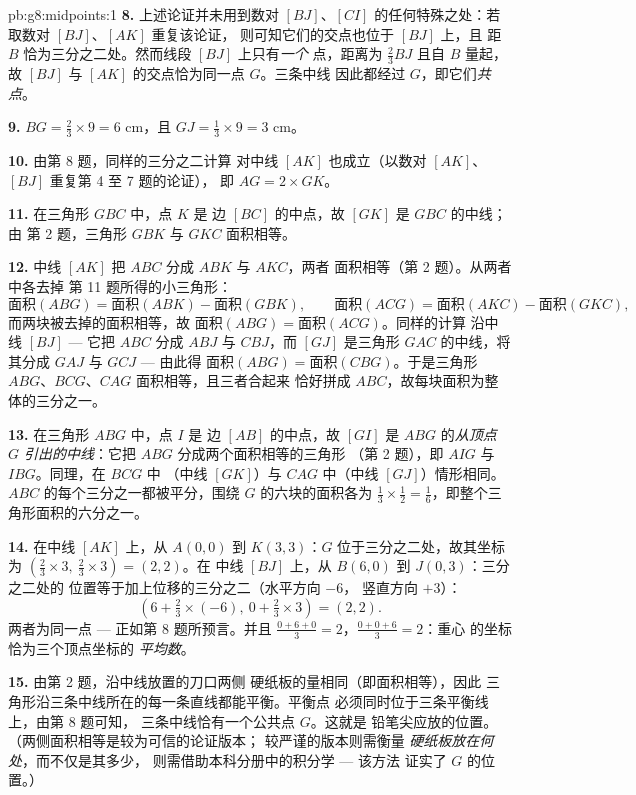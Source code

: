 \begin{solution}{pb:g8:midpoints:1}
\textbf{8.} 上述论证并未用到数对
$[BJ]$、$[CI]$ 的任何特殊之处：若取数对 $[BJ]$、$[AK]$ 重复该论证，
则可知它们的交点也位于 $[BJ]$ 上，且
距 $B$ 恰为三分之二处。然而线段 $[BJ]$ 上只有\emph{一个}
点，距离为 $\frac23 BJ$ 且自 $B$ 量起，故
$[BJ]$ 与 $[AK]$ 的交点恰为同一点 $G$。三条中线
因此都经过 $G$，即它们\emph{共点}。

\textbf{9.} $BG = \frac23 \times 9 = 6$ cm，且
$GJ = \frac13 \times 9 = 3$ cm。

\textbf{10.} 由第 8 题，同样的三分之二计算
对中线 $[AK]$ 也成立（以数对 $[AK]$、$[BJ]$ 重复第 4 至 7 题的论证），
即 $AG = 2 \times GK$。

\textbf{11.} 在三角形 $GBC$ 中，点 $K$ 是
边 $[BC]$ 的中点，故 $[GK]$ 是 $GBC$ 的中线；由
第 2 题，三角形 $GBK$ 与 $GKC$ 面积相等。

\textbf{12.} 中线 $[AK]$ 把 $ABC$ 分成 $ABK$ 与 $AKC$，两者
面积相等（第 2 题）。从两者中各去掉
第 11 题所得的小三角形：
\[
\text{面积}(ABG) = \text{面积}(ABK) - \text{面积}(GBK),
\qquad
\text{面积}(ACG) = \text{面积}(AKC) - \text{面积}(GKC),
\]
而两块被去掉的面积相等，故
$\text{面积}(ABG) = \text{面积}(ACG)$。同样的计算
沿中线 $[BJ]$ --- 它把 $ABC$ 分成 $ABJ$ 与
$CBJ$，而 $[GJ]$ 是三角形 $GAC$ 的中线，将其分成
$GAJ$ 与 $GCJ$ --- 由此得
$\text{面积}(ABG) = \text{面积}(CBG)$。于是三角形
$ABG$、$BCG$、$CAG$ 面积相等，且三者合起来
恰好拼成 $ABC$，故每块面积为整体的三分之一。

\textbf{13.} 在三角形 $ABG$ 中，点 $I$ 是
边 $[AB]$ 的中点，故 $[GI]$ 是 $ABG$ 的\emph{从顶点
$G$ 引出的中线}：它把 $ABG$ 分成两个面积相等的三角形
（第 2 题），即 $AIG$ 与 $IBG$。同理，在 $BCG$ 中
（中线 $[GK]$）与 $CAG$ 中（中线 $[GJ]$）情形相同。
$ABC$ 的每个三分之一都被平分，围绕 $G$ 的六块的面积各为
$\frac13 \times \frac12 = \frac16$，即整个三角形面积的六分之一。

\textbf{14.} 在中线 $[AK]$ 上，从 $A(0,0)$ 到 $K(3,3)$：$G$
位于三分之二处，故其坐标为
$\left(\frac23 \times 3,\ \frac23 \times 3\right) = (2, 2)$。在
中线 $[BJ]$ 上，从 $B(6, 0)$ 到 $J(0, 3)$：三分之二处的
位置等于加上位移的三分之二（水平方向 $-6$，
竖直方向 $+3$）：
\[
\left(6 + \tfrac23 \times (-6),\ 0 + \tfrac23 \times 3\right)
= (2, 2) .
\]
两者为同一点 --- 正如第 8 题所预言。并且
$\frac{0 + 6 + 0}{3} = 2$，$\frac{0 + 0 + 6}{3} = 2$：重心
的坐标恰为三个顶点坐标的
\emph{平均数}。

\textbf{15.} 由第 2 题，沿中线放置的刀口两侧
硬纸板的量相同（即面积相等），因此
三角形沿三条中线所在的每一条直线都能平衡。平衡点
必须同时位于三条平衡线上，由第 8 题可知，
三条中线恰有一个公共点 $G$。这就是
铅笔尖应放的位置。（两侧面积相等是较为可信的论证版本；
较严谨的版本则需衡量
\emph{硬纸板放在何处}，而不仅是其多少，
则需借助本科分册中的积分学 --- 该方法
证实了 $G$ 的位置。）
\end{solution}
